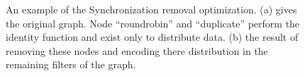 \documentclass[]{article}
\begin{document}
\begin{figure}
\centering
{}
\qquad
{}
\caption[Example of synchronization removal conversion.]{An example of
the Synchronization removal optimization.  (a) gives the original graph.  Node ``roundrobin'' and ``duplicate'' perform the identity function and exist only to distribute data.   (b) the result of removing these nodes and encoding there distribution in the remaining filters of the graph.
\label{fig:example-sr}}
\end{figure}
\end{document}
